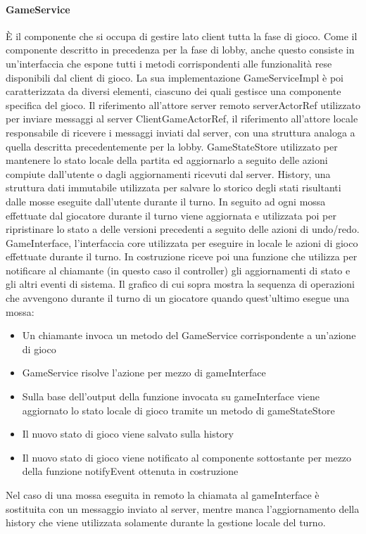 \paragraph{GameService}
È il componente che si occupa di gestire lato client tutta la fase di gioco.
Come il componente descritto in precedenza per la fase di lobby, anche questo consiste in un’interfaccia che espone tutti i metodi corrispondenti alle funzionalità rese disponibili dal client di gioco.
La sua implementazione GameServiceImpl è poi caratterizzata da diversi elementi, ciascuno dei quali gestisce una componente specifica del gioco.
Il riferimento all’attore server remoto serverActorRef utilizzato per inviare messaggi al server
ClientGameActorRef, il riferimento all’attore locale responsabile di ricevere i messaggi inviati dal server, con una struttura analoga a quella descritta precedentemente per la lobby.
GameStateStore utilizzato per mantenere lo stato locale della partita ed aggiornarlo a seguito delle azioni compiute dall’utente o dagli aggiornamenti ricevuti dal server.
History, una struttura dati immutabile utilizzata per salvare lo storico degli stati risultanti dalle mosse eseguite dall’utente durante il turno.
In seguito ad ogni mossa effettuate dal giocatore durante il turno viene aggiornata e utilizzata poi per ripristinare lo stato a delle versioni precedenti a seguito delle azioni di undo/redo.
GameInterface, l’interfaccia core utilizzata per eseguire in locale le azioni di gioco effettuate durante il turno.
In costruzione riceve poi una funzione che utilizza per notificare al chiamante (in questo caso il controller) gli aggiornamenti di stato e gli altri eventi di sistema.
Il grafico di cui sopra mostra la sequenza di operazioni che avvengono durante il turno di un giocatore quando quest’ultimo esegue una mossa:
\begin{itemize}
    \item Un chiamante invoca un metodo del GameService corrispondente a un’azione di gioco
    \item GameService risolve l’azione per mezzo di gameInterface
    \item Sulla base dell’output della funzione invocata su gameInterface viene aggiornato lo stato locale di gioco tramite un metodo di gameStateStore
    \item Il nuovo stato di gioco viene salvato sulla history
    \item Il nuovo stato di gioco viene notificato al componente sottostante per mezzo della funzione notifyEvent ottenuta in costruzione
\end{itemize}
Nel caso di una mossa eseguita in remoto la chiamata al gameInterface è sostituita con un messaggio inviato al server, mentre manca l’aggiornamento della history che viene utilizzata solamente durante la gestione locale del turno.

